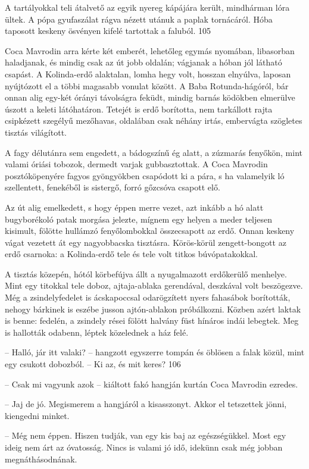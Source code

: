 \documentclass{IEEEtran}
\begin{document}
A tartályokkal teli átalvető az egyik nyereg kápájára került, mindhárman lóra
ültek. A pópa gyufaszálat rágva nézett utánuk a paplak tornácáról. Hóba
taposott keskeny ösvényen kifelé tartottak a faluból.
105

Coca Mavrodin arra kérte két emberét, lehetőleg egymás nyomában, libasorban
haladjanak, és mindig csak az út jobb oldalán; vágjanak a hóban jól látható
csapást. A Kolinda-erdő alaktalan, lomha hegy volt, hosszan elnyúlva, laposan
nyújtózott el a többi magasabb vonulat között. A Baba Rotunda-hágóról, bár
onnan alig egy-két órányi távolságra feküdt, mindig barnás ködökben elmerülve
úszott a keleti látóhatáron. Tetejét is erdő borította, nem tarkállott rajta
csipkézett szegélyű mezőhavas, oldalában csak néhány irtás, embervágta
szögletes tisztás világított.

A fagy délutánra sem engedett, a bádogszínű ég alatt, a zúzmarás fenyőkön,
mint valami óriási tobozok, dermedt varjak gubbasztottak. A Coca Mavrodin
posztóköpenyére fagyos gyöngyökben csapódott ki a pára, s ha valamelyik ló
szellentett, fenekéből is sistergő, forró gőzcsóva csapott elő.

Az út alig emelkedett, s hogy éppen merre vezet, azt inkább a hó alatt
bugyborékoló patak morgása jelezte, mígnem egy helyen a meder teljesen
kisimult, fölötte hullámzó fenyőlombokkal összecsapott az erdő. Onnan keskeny
vágat vezetett át egy nagyobbacska tisztásra. Körös-körül zengett-bongott az
erdő csarnoka: a Kolinda-erdő tele és tele volt titkos búvópatakokkal.

A tisztás közepén, hótól körbefújva állt a nyugalmazott erdőkerülő menhelye.
Mint egy titokkal tele doboz, ajtaja-ablaka gerendával, deszkával volt
beszögezve. Még a zsindelyfedelet is ácskapoccsal odarögzített nyers fahasábok
borították, nehogy bárkinek is eszébe jusson ajtón-ablakon próbálkozni. Közben
azért laktak is benne: fedelén, a zsindely rései fölött halvány füst hínáros
indái lebegtek. Meg is hallották odabenn, léptek közelednek a ház felé.

– Halló, jár itt valaki? – hangzott egyszerre tompán és öblösen a falak közül,
mint egy csukott dobozból. – Ki az, és mit keres?
106

– Csak mi vagyunk azok – kiáltott fakó hangján kurtán Coca Mavrodin ezredes.

– Jaj de jó. Megismerem a hangjáról a kisasszonyt. Akkor el tetszettek jönni,
kiengedni minket.

– Még nem éppen. Hiszen tudják, van egy kis baj az egészségükkel. Most egy
ideig nem árt az óvatosság. Nincs is valami jó idő, idekünn csak még jobban
megnáthásodnának.
\end{document}
